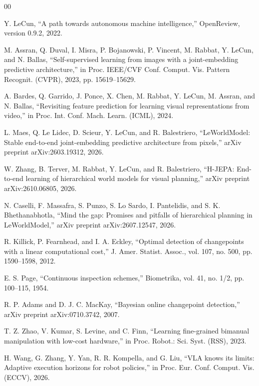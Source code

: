 \documentclass[conference]{IEEEtran}
\begin{document}
\begin{thebibliography}{00}

 Y. LeCun, ``A path towards autonomous machine intelligence,'' OpenReview, version 0.9.2, 2022.

 M. Assran, Q. Duval, I. Misra, P. Bojanowski, P. Vincent, M. Rabbat, Y. LeCun, and N. Ballas, ``Self-supervised learning from images with a joint-embedding predictive architecture,'' in Proc. IEEE/CVF Conf. Comput. Vis. Pattern Recognit. (CVPR), 2023, pp. 15619--15629.

 A. Bardes, Q. Garrido, J. Ponce, X. Chen, M. Rabbat, Y. LeCun, M. Assran, and N. Ballas, ``Revisiting feature prediction for learning visual representations from video,'' in Proc. Int. Conf. Mach. Learn. (ICML), 2024.

 L. Maes, Q. Le Lidec, D. Scieur, Y. LeCun, and R. Balestriero, ``LeWorldModel: Stable end-to-end joint-embedding predictive architecture from pixels,'' arXiv preprint arXiv:2603.19312, 2026.

 W. Zhang, B. Terver, M. Rabbat, Y. LeCun, and R. Balestriero, ``H-JEPA: End-to-end learning of hierarchical world models for visual planning,'' arXiv preprint arXiv:2610.06805, 2026.

 N. Caselli, F. Massafra, S. Punzo, S. Lo Sardo, I. Pantelidis, and S. K. Bhethanabhotla, ``Mind the gap: Promises and pitfalls of hierarchical planning in LeWorldModel,'' arXiv preprint arXiv:2607.12547, 2026.

 R. Killick, P. Fearnhead, and I. A. Eckley, ``Optimal detection of changepoints with a linear computational cost,'' J. Amer. Statist. Assoc., vol. 107, no. 500, pp. 1590--1598, 2012.

 E. S. Page, ``Continuous inspection schemes,'' Biometrika, vol. 41, no. 1/2, pp. 100--115, 1954.

 R. P. Adams and D. J. C. MacKay, ``Bayesian online changepoint detection,'' arXiv preprint arXiv:0710.3742, 2007.

 T. Z. Zhao, V. Kumar, S. Levine, and C. Finn, ``Learning fine-grained bimanual manipulation with low-cost hardware,'' in Proc. Robot.: Sci. Syst. (RSS), 2023.

 H. Wang, G. Zhang, Y. Yan, R. R. Kompella, and G. Liu, ``VLA knows its limits: Adaptive execution horizons for robot policies,'' in Proc. Eur. Conf. Comput. Vis. (ECCV), 2026.


\end{thebibliography}
\end{document}
